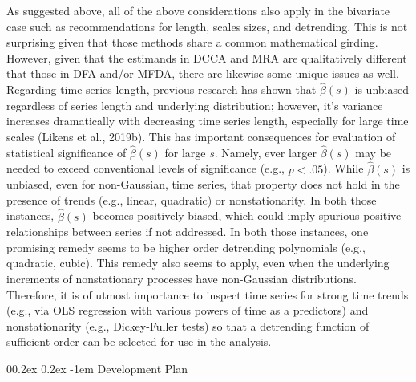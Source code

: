 \documentclass[
  man]{apa6}
\makeatletter
\let\oldparagraph\paragraph
\renewcommand{\paragraph}[1]{\oldparagraph{#1}\mbox{}}
\renewcommand{\paragraph}{\@startsection{paragraph}{4}{\parindent}%
  {0\baselineskip \@plus 0.2ex \@minus 0.2ex}%
  {-1em}%
  {\normalfont\normalsize\bfseries\itshape\typesectitle}}
\makeatother
\begin{document}
As suggested above, all of the above considerations also apply in the
bivariate case such as recommendations for length, scales sizes, and
detrending. This is not surprising given that those methods share a
common mathematical girding. However, given that the estimands in DCCA
and MRA are qualitatively different that those in DFA and/or MFDA, there
are likewise some unique issues as well. Regarding time series length,
previous research has shown that \(\widehat{\beta}(s)\) is unbiased
regardless of series length and underlying distribution; however, it's
variance increases dramatically with decreasing time series length,
especially for large time scales (Likens et al., 2019b). This has important
consequences for evaluation of statistical significance of
\(\widehat{\beta}(s)\) for large \(s\). Namely, ever larger
\(\widehat{\beta}(s)\) may be needed to exceed conventional levels of
significance (e.g., \(p<.05\)). While \(\widehat{\beta}(s)\) is unbiased,
even for non-Gaussian, time series, that property does not hold in the
presence of trends (e.g., linear, quadratic) or nonstationarity. In both
those instances, \(\widehat{\beta}(s)\) becomes positively biased, which
could imply spurious positive relationships between series if not
addressed. In both those instances, one promising remedy seems to be
higher order detrending polynomials (e.g., quadratic, cubic). This
remedy also seems to apply, even when the underlying increments of
nonstationary processes have non-Gaussian distributions. Therefore, it
is of utmost importance to inspect time series for strong time trends
(e.g., via OLS regression with various powers of time as a predictors)
and nonstationarity (e.g., Dickey-Fuller tests) so that a detrending
function of sufficient order can be selected for use in the analysis.

\hypertarget{development-plan}{%
\paragraph{Development Plan}\label{development-plan}}
\end{document}
